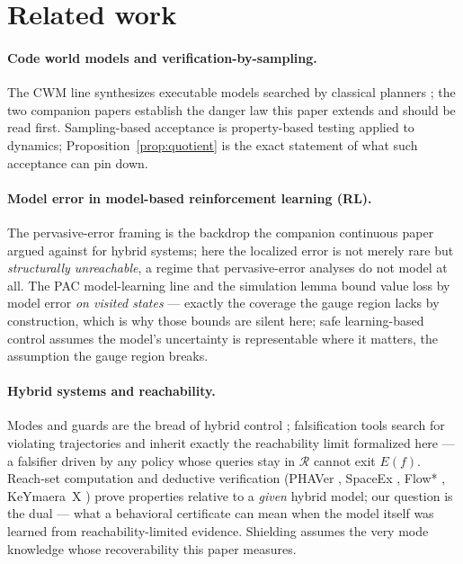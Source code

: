 \documentclass[11pt]{article}
\theoremstyle{remark}
\begin{document}
\section{Related work}
\label{sec:related}

\paragraph{Code world models and verification-by-sampling.} The CWM line
synthesizes executable models searched by classical planners
\citep{lehrach2025cwm, liang2023codeaspolicies, gao2023pal}; the two
companion papers \citep{aguilar2026verified, aguilar2026omitted} establish
the danger law this paper extends and should be read first. Sampling-based
acceptance is property-based testing \citep{claessen2000quickcheck} applied
to dynamics; Proposition~\ref{prop:quotient} is the exact statement of
what such acceptance can pin down.

\paragraph{Model error in model-based reinforcement learning (RL).} The pervasive-error framing
\citep{janner2019mbpo, lambert2020objective, hafner2020dreamer,
nagabandi2018neural, chua2018deep} is the backdrop the companion continuous
paper argued against for hybrid systems; here the localized error is not
merely rare but \emph{structurally unreachable}, a regime that
pervasive-error analyses do not model at all. The PAC model-learning line
and the simulation lemma \citep{kearns2002near, strehl2009reinforcement}
bound value loss by model error \emph{on visited states} --- exactly the
coverage the gauge region lacks by construction, which is why those bounds
are silent here; safe learning-based control
\citep{aswani2013provably, berkenkamp2017safe} assumes the model's
uncertainty is representable where it matters, the assumption the gauge
region breaks.

\paragraph{Hybrid systems and reachability.} Modes and guards are the
bread of hybrid control \citep{paoletti2007hybrid, bemporad1999control};
falsification tools \citep{annpureddy2011staliro, corso2021survey} search
for violating trajectories and inherit exactly the reachability limit
formalized here --- a falsifier driven by any policy whose queries stay in
$\mathcal{R}$ cannot exit $E(f)$. Reach-set computation and deductive
verification (PHAVer \citep{frehse2005phaver}, SpaceEx
\citep{frehse2011spaceex}, Flow* \citep{chen2013flow}, KeYmaera~X
\citep{fulton2015keymaerax}) prove properties relative to a \emph{given}
hybrid model; our question is the dual --- what a behavioral certificate
can mean when the model itself was learned from reachability-limited
evidence.
Shielding \citep{alshiekh2018shielding}
assumes the very mode knowledge whose recoverability this paper measures.
\end{document}
